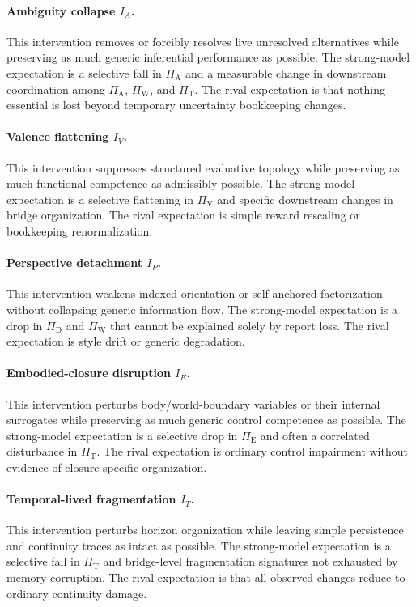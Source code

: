 \documentclass[11pt,a4paper]{article}
\theoremstyle{definition}
\newcommand{\PiD}{\Pi_{\mathrm{D}}}
\newcommand{\PiV}{\Pi_{\mathrm{V}}}
\newcommand{\PiW}{\Pi_{\mathrm{W}}}
\newcommand{\PiA}{\Pi_{\mathrm{A}}}
\newcommand{\PiE}{\Pi_{\mathrm{E}}}
\newcommand{\PiT}{\Pi_{\mathrm{T}}}
\begin{document}
\paragraph{Ambiguity collapse $I_A$.}
This intervention removes or forcibly resolves live unresolved alternatives while preserving as much generic inferential performance as possible. The strong-model expectation is a selective fall in $\PiA$ and a measurable change in downstream coordination among $\PiA$, $\PiW$, and $\PiT$. The rival expectation is that nothing essential is lost beyond temporary uncertainty bookkeeping changes.

\paragraph{Valence flattening $I_V$.}
This intervention suppresses structured evaluative topology while preserving as much functional competence as admissibly possible. The strong-model expectation is a selective flattening in $\PiV$ and specific downstream changes in bridge organization. The rival expectation is simple reward rescaling or bookkeeping renormalization.

\paragraph{Perspective detachment $I_P$.}
This intervention weakens indexed orientation or self-anchored factorization without collapsing generic information flow. The strong-model expectation is a drop in $\PiD$ and $\PiW$ that cannot be explained solely by report loss. The rival expectation is style drift or generic degradation.

\paragraph{Embodied-closure disruption $I_E$.}
This intervention perturbs body/world-boundary variables or their internal surrogates while preserving as much generic control competence as possible. The strong-model expectation is a selective drop in $\PiE$ and often a correlated disturbance in $\PiT$. The rival expectation is ordinary control impairment without evidence of closure-specific organization.

\paragraph{Temporal-lived fragmentation $I_T$.}
This intervention perturbs horizon organization while leaving simple persistence and continuity traces as intact as possible. The strong-model expectation is a selective fall in $\PiT$ and bridge-level fragmentation signatures not exhausted by memory corruption. The rival expectation is that all observed changes reduce to ordinary continuity damage.
\end{document}
